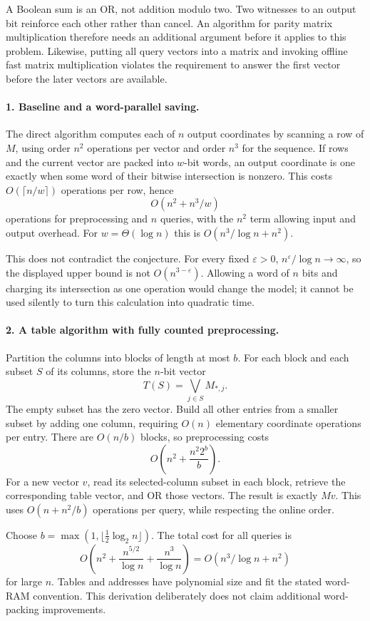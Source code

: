 \documentclass[11pt]{article}
\begin{document}
A Boolean sum is an OR, not addition modulo two. Two witnesses to an output bit reinforce each other rather than cancel. An algorithm for parity matrix multiplication therefore needs an additional argument before it applies to this problem. Likewise, putting all query vectors into a matrix and invoking offline fast matrix multiplication violates the requirement to answer the first vector before the later vectors are available.

\paragraph{1. Baseline and a word-parallel saving.}
The direct algorithm computes each of $n$ output coordinates by scanning a row of $M$, using order $n^2$ operations per vector and order $n^3$ for the sequence. If rows and the current vector are packed into $w$-bit words, an output coordinate is one exactly when some word of their bitwise intersection is nonzero. This costs $O(\lceil n/w\rceil)$ operations per row, hence
\[
 O(n^2+n^3/w)
\]
operations for preprocessing and $n$ queries, with the $n^2$ term allowing input and output overhead. For $w=\Theta(\log n)$ this is $O(n^3/\log n+n^2)$.

This does not contradict the conjecture. For every fixed $\varepsilon>0$, $n^\varepsilon/\log n\to\infty$, so the displayed upper bound is not $O(n^{3-\varepsilon})$. Allowing a word of $n$ bits and charging its intersection as one operation would change the model; it cannot be used silently to turn this calculation into quadratic time.

\paragraph{2. A table algorithm with fully counted preprocessing.}
Partition the columns into blocks of length at most $b$. For each block and each subset $S$ of its columns, store the $n$-bit vector
\[
 T(S)=\bigvee_{j\in S}M_{*,j}.
\]
The empty subset has the zero vector. Build all other entries from a smaller subset by adding one column, requiring $O(n)$ elementary coordinate operations per entry. There are $O(n/b)$ blocks, so preprocessing costs
\[
 O\left(n^2+\frac{n^2 2^b}{b}\right).
\]
For a new vector $v$, read its selected-column subset in each block, retrieve the corresponding table vector, and OR those vectors. The result is exactly $Mv$. This uses $O(n+n^2/b)$ operations per query, while respecting the online order.

Choose $b=\max(1,\lfloor\tfrac12\log_2 n\rfloor)$. The total cost for all queries is
\[
 O\left(n^2+\frac{n^{5/2}}{\log n}+\frac{n^3}{\log n}\right)
 =O(n^3/\log n+n^2)
\]
for large $n$. Tables and addresses have polynomial size and fit the stated word-RAM convention. This derivation deliberately does not claim additional word-packing improvements.
\end{document}

